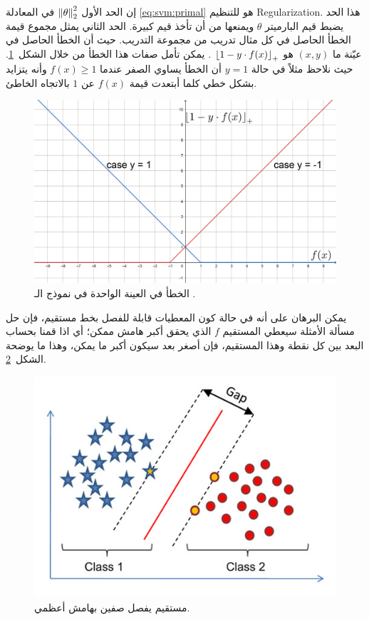 إن الحد الأول $ \left\lVert\theta\right\rVert_{2}^2 $ في المعادلة \ref{eq:svm:primal} هو للتنظيم \textenglish{Regularization}.
هذا الحد يضبط قيم البارميتر $ \theta $ ويمنعها من أن تأخذ قيم كبيرة.
الحد الثاني يمثل مجموع قيمة الخطأ الحاصل في كل مثال تدريب من مجموعة التدريب.
حيث أن الخطأ الحاصل في عيّنة ما $ (x, y) $ هو
 $ \left\lfloor1 - y \cdot f(x)\right\rfloor_{+} $%
. يمكن تأمل صفات هذا الخطأ من خلال الشكل~\ref{fig:svm:error}.
حيث نلاحظ مثلاً في حالة $ y = 1 $ أن الخطأ يساوي الصفر عندما $ f(x) \geq 1 $ 
وأنه يتزايد بشكل خطي كلما أبتعدت قيمة $ f(x) $ عن $1$ بالاتجاه الخاطئ.
 \begin{figure}[htb] 
 	\centering
 	\includegraphics[width=0.7\linewidth]{images/svm-error.png}
 	\caption{%
 		الخطأ في العينة الواحدة في نموذج الـ .
 	}
 	\label{fig:svm:error}
 \end{figure}

يمكن البرهان على أنه في حالة كون المعطيات قابلة للفصل بخط مستقيم، فإن حل مسألة الأمثلة سيعطي المستقيم $f$ الذي يحقق أكبر هامش ممكن؛
أي اذا قمنا بحساب البعد بين كل نقطة وهذا المستقيم، فإن أصغر بعد سيكون أكبر ما يمكن، وهذا ما يوضحة الشكل~\ref{fig:svm:margin}.
 \begin{figure}[htb]
	\centering
	\includegraphics[width=0.5\linewidth]{images/svm-margin.jpg}
	\caption{
		مستقيم يفصل صفين بهامش أعظمي.
	}
	\label{fig:svm:margin}
\end{figure}

